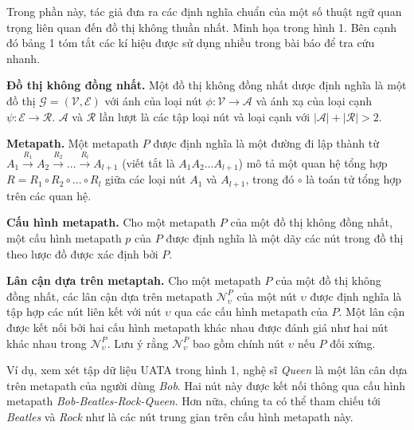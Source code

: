Trong phần này, tác giả đưa ra các định nghĩa chuẩn của một số thuật ngữ quan trọng liên quan đến đồ thị không thuần nhất. Minh họa trong hình 1. Bên cạnh đó bảng 1 tóm tắt các kí hiệu được sử dụng nhiều trong bài báo để tra cứu nhanh.

\begin{definition}
\textbf{Đồ thị không đồng nhất.} Một đồ thị không đồng nhất dược định nghĩa là một đồ thị $\pmb{\mathcal{G}} = (\pmb{\mathcal{V}}, \pmb{\mathcal{E}})$ với ánh của loại nút $\phi: \pmb{\mathcal{V}} \to \pmb{\mathcal{A}}$ và ánh xạ của loại cạnh $\psi: \pmb{\mathcal{E}} \to \pmb{\mathcal{R}}$. $\pmb{\mathcal{A}}$ và $\pmb{\mathcal{R}}$ lần lượt là các tập loại nút và loại cạnh với $|\pmb{\mathcal{A}}| + |\pmb{\mathcal{R}}| > 2$.
\end{definition}

\begin{definition}
  \textbf{Metapath.} Một metapath $P$ được định nghĩa là một đường đi lập thành từ $A_1  \xrightarrow{R_1} A_2  \xrightarrow{R_2} ... \xrightarrow{R_l} A_{l+1}$ (viết tắt là $A_1 A_2 ... A_{l+1}$) mô tả một quan hệ tổng hợp $R = R_1 \circ R_2 \circ ... \circ R_l$ giữa các loại nút $A_1$ và $A_{l+1}$, trong đó $\circ$ là toán tử tổng hợp trên các quan hệ.
\end{definition}

\begin{definition}
  \textbf{Cấu hình metapath.} Cho một metapath $P$ của một đồ thị không đồng nhất, một cấu hình metapath $p$ của $P$ được định nghĩa là một dãy các nút trong đồ thị theo lược đồ được xác định bởi $P$.
\end{definition}

\begin{definition}
  \textbf{Lân cận dựa trên metaptah.} Cho một metapath $P$ của một đồ thị không đồng nhất, các lân cận dựa trên metapath $\pmb{\mathcal{N}}_\upsilon ^ P$ của một nút $\upsilon$ được định nghĩa là tập hợp các nút liên kết với nút $\upsilon$ qua các cấu hình metapath của $P$. Một lân cận được kết nối bởi hai cấu hình metapath khác nhau được đánh giá như hai nút khác nhau trong $\pmb{\mathcal{N}}_\upsilon ^ P$. Lưu ý rằng $\pmb{\mathcal{N}}_\upsilon ^ P$ bao gồm chính nút $\upsilon$ nếu $P$ đối xứng.

  Ví dụ, xem xét tập dữ liệu UATA trong hình 1, nghệ sĩ \textit{Queen} là một lân cân dựa trên metapath của người dùng \textit{Bob}. Hai nút này được kết nối thông qua cấu hình metapath \textit{Bob-Beatles-Rock-Queen}. Hơn nữa, chúng ta có thể tham chiếu tới \textit{Beatles} và \textit{Rock} như là các nút trung gian trên cấu hình metapath này.
\end{definition}

